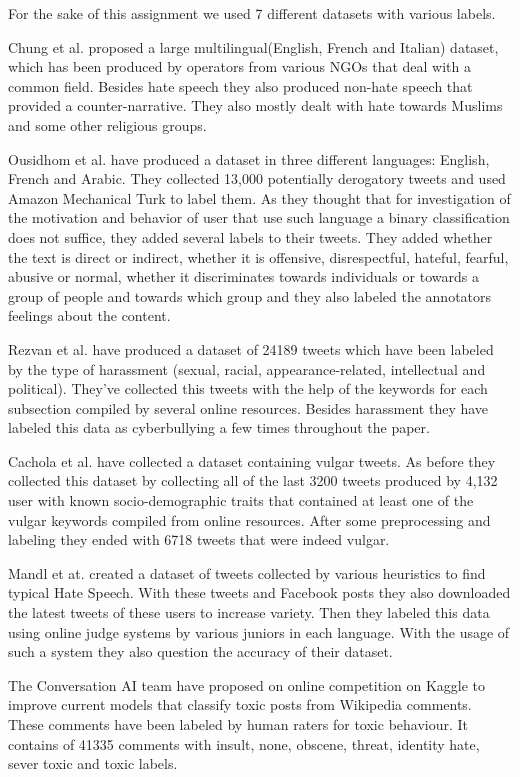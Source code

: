 \documentclass[fleqn,moreauthors,10pt]{ds_report}
\begin{document}
For the sake of this assignment we used 7 different datasets with various labels. 

Chung et al. \cite{16_facebook} proposed a large multilingual(English, French and Italian) dataset, which has been produced by operators from various NGOs that deal with a common field. Besides hate speech they also produced non-hate speech that provided a counter-narrative. They also mostly dealt with hate towards Muslims and some other religious groups.

Ousidhom et al. \cite{20_twitter} have produced a dataset in three different languages: English, French and Arabic. They collected 13,000 potentially derogatory tweets and used Amazon Mechanical Turk to label them. As they thought that for investigation of the motivation and behavior of user that use such language a binary classification does not suffice, they added several labels to their tweets. They added whether the text is direct or indirect, whether it is offensive, disrespectful, hateful, fearful, abusive or normal, whether it discriminates towards individuals or towards a group of people and towards which group and they also labeled the annotators feelings about the content.

Rezvan et al. \cite{32_twitter} have produced a dataset of 24189 tweets which have been labeled by the type of harassment (sexual, racial, appearance-related, intellectual and political). They've collected this tweets with the help of the keywords for each subsection compiled by several online resources. Besides harassment they have labeled this data as cyberbullying a few times throughout the paper.

Cachola et al. \cite{vulgar-twitter} have collected a dataset containing vulgar tweets. As before they collected this dataset by collecting all of the last 3200 tweets produced by 4,132 user with known socio-demographic traits that contained at least one of the vulgar keywords compiled from online resources. After some preprocessing and labeling they ended with 6718 tweets that were indeed vulgar.

Mandl et at. \cite{25_twitter} created a dataset of tweets collected by various heuristics to find typical Hate Speech. With these tweets and Facebook posts they also downloaded the latest tweets of these users to increase variety. Then they labeled this data using online judge systems by various juniors in each language. With the usage of such a system they also question the accuracy of their dataset.

The Conversation AI team \cite{kaggle-jigsaw} have proposed on online competition on Kaggle to improve current models that classify toxic posts from Wikipedia comments. These comments have been labeled by human raters for toxic behaviour. It contains of 41335 comments with insult, none, obscene, threat, identity hate, sever toxic and toxic labels.
\end{document}
